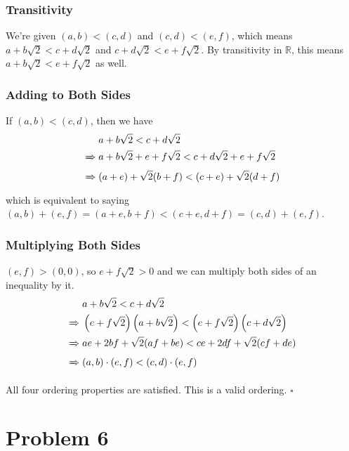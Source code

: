 \documentclass[12pt]{article}
\newcommand{\ra}{\xRightarrow}
\begin{document}
\subsubsection{Transitivity}

We're given $(a,b)<(c,d)$ and $(c,d)<(e,f)$, which means
$a+b\sqrt{2}<c+d\sqrt{2}$ and $c+d\sqrt{2}<e+f\sqrt{2}$.
By transitivity in $\mathbb{R}$, this means $a+b\sqrt{2}<e+f\sqrt{2}$ as well.

\subsubsection{Adding to Both Sides}

If $(a,b)<(c,d)$, then we have
\begin{align*}
              & a+b\sqrt{2}<c+d\sqrt{2}                         \\
      \ra\ {} & a+b\sqrt{2}+e+f\sqrt{2}<c+d\sqrt{2}+e+f\sqrt{2} \\
      \ra\ {} & (a+e)+\sqrt{2}(b+f)<(c+e)+\sqrt{2}(d+f)
\end{align*}
which is equivalent to saying $(a,b)+(e,f)=(a+e,b+f)<(c+e,d+f)=(c,d)+(e,f)$.

\subsubsection{Multiplying Both Sides}

$(e,f)>(0,0)$, so $e+f\sqrt{2}>0$ and we can multiply both sides of an inequality by it.
\begin{align*}
              & a+b\sqrt{2}<c+d\sqrt{2}                                                                             \\
      \ra\ {} & \left(e+f\sqrt{2}\right)\left(a+b\sqrt{2}\right) < \left(e+f\sqrt{2}\right)\left(c+d\sqrt{2}\right) \\
      \ra\ {} & ae+2bf+\sqrt{2}(af+be) < ce+2df+\sqrt{2}(cf+de)                                                     \\
      \ra\ {} & (a,b) \cdot (e, f) < (c, d) \cdot (e, f)
\end{align*}

All four ordering properties are satisfied.
This is a valid ordering. $\square$

\pagebreak

\section{Problem 6}
\end{document}
